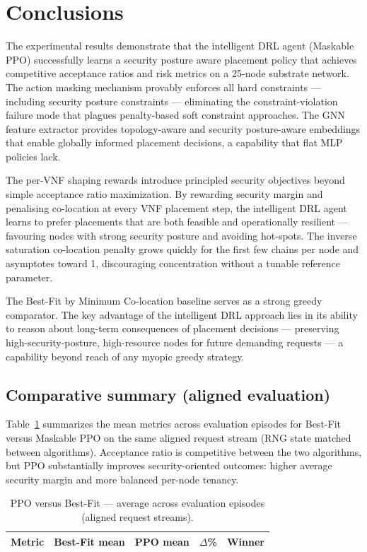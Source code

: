 \section{Conclusions}

The experimental results demonstrate that the intelligent DRL agent (Maskable PPO) successfully learns a security posture aware placement policy that achieves competitive acceptance ratios and risk metrics on a 25-node substrate network. The action masking mechanism provably enforces all hard constraints — including security posture constraints — eliminating the constraint-violation failure mode that plagues penalty-based soft constraint approaches. The GNN feature extractor provides topology-aware and security posture-aware embeddings that enable globally informed placement decisions, a capability that flat MLP policies lack.

The per-VNF shaping rewards introduce principled security objectives beyond simple acceptance ratio maximization. By rewarding security margin and penalising co-location at every VNF placement step, the intelligent DRL agent learns to prefer placements that are both feasible and operationally resilient — favouring nodes with strong security posture and avoiding hot-spots. The inverse saturation co-location penalty grows quickly for the first few chains per node and asymptotes toward 1, discouraging concentration without a tunable reference parameter.

The Best-Fit by Minimum Co-location baseline serves as a strong greedy comparator. The key advantage of the intelligent DRL approach lies in its ability to reason about long-term consequences of placement decisions — preserving high-security-posture, high-resource nodes for future demanding requests — a capability beyond reach of any myopic greedy strategy.

\subsection{Comparative summary (aligned evaluation)}

Table~\ref{tab:conclusion_compare} summarizes the mean metrics across evaluation episodes for Best-Fit versus Maskable PPO on the same aligned request stream (RNG state matched between algorithms). Acceptance ratio is competitive between the two algorithms, but PPO substantially improves security-oriented outcomes: higher average security margin and more balanced per-node tenancy.

\begin{table}[!ht]
\centering
\caption{PPO versus Best-Fit --- average across evaluation episodes (aligned request streams).}
\label{tab:conclusion_compare}
\begin{tabular}{l r r r l}
\toprule
\textbf{Metric} & \textbf{Best-Fit mean} & \textbf{PPO mean} & \textbf{$\Delta$\%} & \textbf{Winner} \\
\midrule

\bottomrule
\end{tabular}
\end{table}

